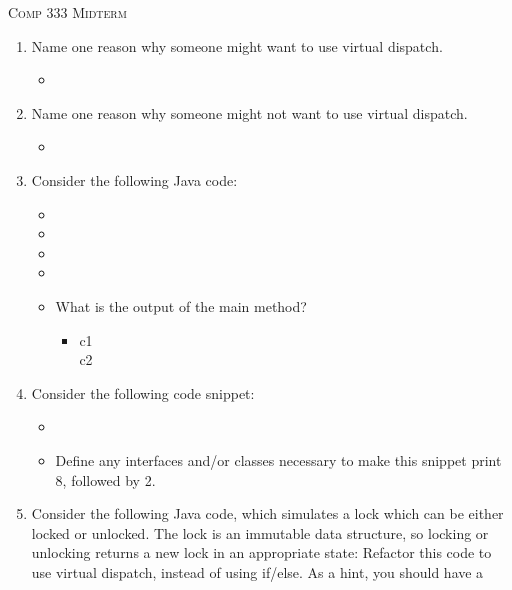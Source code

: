 \documentclass[12pt,a4paper]{article}
\begin{document}
  \begin{center}
    \large\textsc{Comp 333 Midterm}
  \end{center}
  \begin{enumerate}
    \item Name one reason why someone might want to use virtual dispatch. %
    \begin{itemize}
      \item 
    \end{itemize}
    \item Name one reason why someone might not want to use virtual dispatch. %
    \begin{itemize}
      \item
    \end{itemize}
    \clearpage
    \item Consider the following Java code: %
    \begin{itemize}
      \item[] 
      \item[] 
      \item[] 
      \item[] 
      \item[] What is the output of the main method? 
      \begin{itemize}
        \item[] c1\\c2
      \end{itemize} 
    \end{itemize}
    \clearpage
    \item Consider the following code snippet: %
    \begin{itemize}
      \item[] 
      \item[] Define any interfaces and/or classes necessary to make this snippet print 8, followed by 2. 
    \end{itemize}
    \clearpage
    \item Consider the following Java code, which simulates a lock which can be either locked or
    unlocked. The lock is an immutable data structure, so locking or unlocking returns a new lock
    in an appropriate state: Refactor this code to use virtual dispatch, instead of using if/else. As a hint, you should have a

\end{enumerate}
\end{document}
